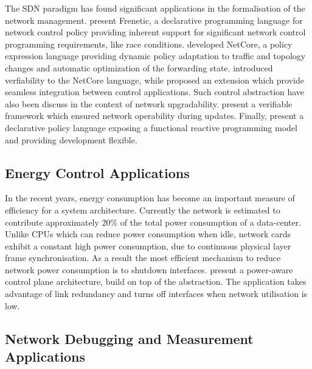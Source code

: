 The SDN paradigm has found significant applications in the formalisation of the
network management.  present Frenetic, a declarative
programming language for network control policy providing inherent support for
significant network control programming requirements, like race conditions.
 developed NetCore, a policy expression language providing
dynamic policy adaptation to traffic and topology changes and automatic
optimization of the forwarding state.  introduced verfiability to
the NetCore language, while  proposed an extension which
provide seamless integration between control applications. Such control
abstraction have also been discuss in the context of network upgradability.
 present a verifiable framework which ensured network
operability during updates. Finally,  present a declarative
policy language exposing a functional reactive programming model and providing
development flexible. 

\subsection{Energy Control Applications}

In the recent years, energy consumption has become an important measure of
efficiency for a system architecture. Currently the network is estimated to
contribute approximately 20\% of the total power consumption of a data-center.
Unlike CPUs which can reduce power consumption when idle, network cards exhibit
a constant high power consumption, due to continuous physical layer frame
synchronisation. As a result the most efficient mechanism to reduce network
power consumption is to shutdown interfaces.   present a
power-aware control plane architecture, build on top of the \of abstraction. The
application takes advantage of link redundancy and turns off interfaces when
network utilisation is low. 

\subsection{Network Debugging and Measurement Applications}

